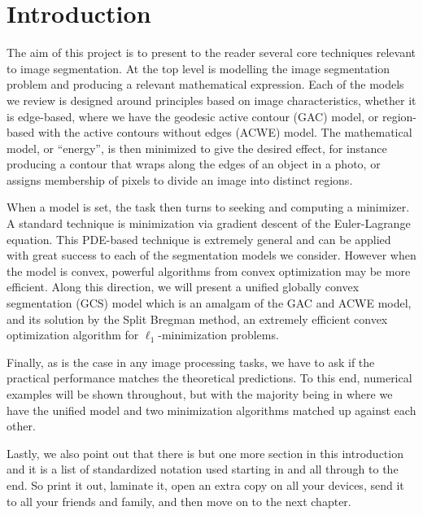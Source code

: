 \chapter{Introduction}
The aim of this project is to present to the reader several core techniques relevant to image segmentation. At the top level is modelling the image segmentation problem and producing a relevant mathematical expression. Each of the models we review is designed around principles based on image characteristics, whether it is edge-based, where we have the geodesic active contour (GAC) model, or region-based with the active contours without edges (ACWE) model. The mathematical model, or ``energy'', is then minimized to give the desired effect, for instance producing a contour that wraps along the edges of an object in a photo, or assigns membership of pixels to divide an image into distinct regions. 

When a model is set, the task then turns to seeking and computing a minimizer. A standard technique is minimization via gradient descent of the Euler-Lagrange equation. This PDE-based technique is extremely general and can be applied with great success to each of the segmentation models we consider. However when the model is convex, powerful algorithms from convex optimization may be more efficient. Along this direction, we will present a unified globally convex segmentation (GCS) model which is an amalgam of the GAC and ACWE model, and its solution by the Split Bregman method, an extremely efficient convex optimization algorithm for $\ell_1$-minimization problems.

Finally, as is the case in any image processing tasks, we have to ask if the practical performance matches the theoretical predictions. To this end, numerical examples will be shown throughout, but with the majority being in  where we have the unified model and two minimization algorithms matched up against each other.


Lastly, we also point out that there is but one more section in this introduction and it is a list of standardized notation used starting in  and all through to the end. So print it out, laminate it, open an extra copy on all your devices, send it to all your friends and family, and then move on to the next chapter. 

\newpage
